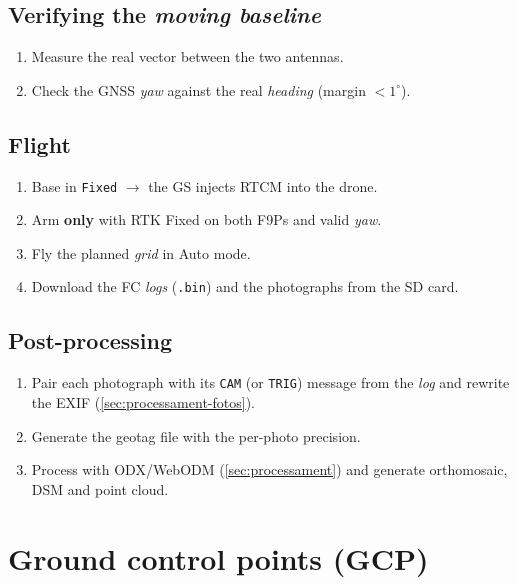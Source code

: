 \subsection{Verifying the \emph{moving baseline}}
\begin{enumerate}[label=\alph*)]
    \item Measure the real vector between the two antennas.
    \item Check the GNSS \emph{yaw} against the real \emph{heading} (margin $< 1^{\circ}$).
\end{enumerate}

\subsection{Flight}
\begin{enumerate}[label=\alph*)]
    \item Base in \texttt{Fixed} $\rightarrow$ the GS injects RTCM into the drone.
    \item Arm \textbf{only} with RTK Fixed on both F9Ps and valid \emph{yaw}.
    \item Fly the planned \emph{grid} in Auto mode.
    \item Download the FC \emph{logs} (\texttt{.bin}) and the photographs from the SD card.
\end{enumerate}

\subsection{Post-processing}
\begin{enumerate}[label=\alph*)]
    \item Pair each photograph with its \texttt{CAM} (or \texttt{TRIG}) message from the \emph{log} and rewrite the EXIF (\cref{sec:processament-fotos}).
    \item Generate the geotag file with the per-photo precision.
    \item Process with ODX/WebODM (\cref{sec:processament}) and generate orthomosaic, DSM and point cloud.
\end{enumerate}

\section{Ground control points (GCP)}
\label{sec:gcp}

